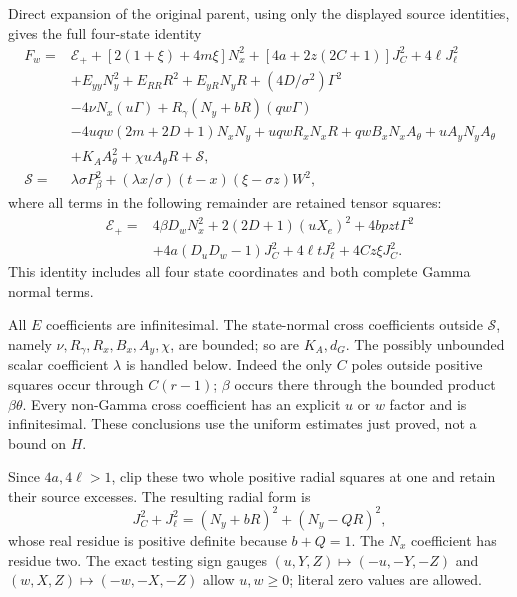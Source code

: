 Direct expansion of the original parent, using only the displayed source
identities, gives the full four-state identity
\begin{align}
 F_w={}&\mathcal E_++[2(1+\xi)+4m\xi]N_x^2
       +[4a+2z(2C+1)]J_C^2+4\ell J_\ell^2\nonumber\\
 &+E_{yy}N_y^2+E_{RR}R^2+E_{yR}N_yR
        +(4D/\sigma^2)\Gamma^2\nonumber\\
 &-4\nu N_x(u\Gamma)
       +R_\gamma(N_y+bR)(qw\Gamma)\nonumber\\
 &-4uqw(2m+2D+1)N_xN_y+uqwR_xN_xR
           +qwB_xN_xA_\theta+uA_yN_yA_\theta\nonumber\\
 &+K_AA_\theta^2+\chi uA_\theta R+\mathscr S,
 \label{eq:compression-full-parent}\tag{SP6}\\
 \mathscr S={}&\lambda\sigma P_\beta^2
       +(\lambda x/\sigma)(t-x)(\xi-\sigma z)W^2,\nonumber
\end{align}
where all terms in the following remainder are retained tensor squares:
\[
\begin{split}
 \mathcal E_+={}&4\beta D_wN_x^2+2(2D+1)(uX_e)^2
              +4bpzt\Gamma^2\\
 &+4a(D_uD_w-1)J_C^2+4\ell tJ_\ell^2+4Cz\xi J_C^2.
\end{split}
\]
This identity includes all four state coordinates and both complete Gamma normal terms.  


All $E$ coefficients are infinitesimal. The state-normal cross
coefficients outside $\mathscr S$, namely
$\nu,R_\gamma,R_x,B_x,A_y,\chi$, are bounded; so are $K_A,d_G$.
The possibly unbounded scalar coefficient $\lambda$ is handled below.
Indeed the only $C$ poles outside positive squares occur through
$C(r-1)$; $\beta$ occurs there through the bounded product
$\beta\theta$. Every non-Gamma cross coefficient has an explicit
$u$ or $w$ factor and is infinitesimal. These conclusions use the
uniform estimates just proved, not a bound on $H$.

Since $4a,4\ell>1$, clip these two whole positive radial squares at
one and retain their source excesses. The resulting radial form is
\[
 J_C^2+J_\ell^2=(N_y+bR)^2+(N_y-QR)^2,
\]
whose real residue is positive definite because $b+Q=1$.
The $N_x$ coefficient has residue two. The exact testing sign gauges
$(u,Y,Z)\mapsto(-u,-Y,-Z)$ and $(w,X,Z)\mapsto(-w,-X,-Z)$
allow $u,w\ge0$; literal zero values are allowed.

